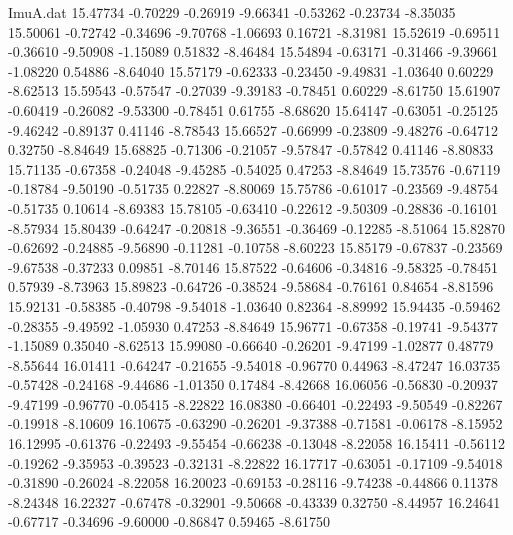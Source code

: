 \begin{filecontents}{ImuA.dat}
  15.47734   -0.70229   -0.26919   -9.66341   -0.53262   -0.23734   -8.35035
  15.50061   -0.72742   -0.34696   -9.70768   -1.06693    0.16721   -8.31981
  15.52619   -0.69511   -0.36610   -9.50908   -1.15089    0.51832   -8.46484
  15.54894   -0.63171   -0.31466   -9.39661   -1.08220    0.54886   -8.64040
  15.57179   -0.62333   -0.23450   -9.49831   -1.03640    0.60229   -8.62513
  15.59543   -0.57547   -0.27039   -9.39183   -0.78451    0.60229   -8.61750
  15.61907   -0.60419   -0.26082   -9.53300   -0.78451    0.61755   -8.68620
  15.64147   -0.63051   -0.25125   -9.46242   -0.89137    0.41146   -8.78543
  15.66527   -0.66999   -0.23809   -9.48276   -0.64712    0.32750   -8.84649
  15.68825   -0.71306   -0.21057   -9.57847   -0.57842    0.41146   -8.80833
  15.71135   -0.67358   -0.24048   -9.45285   -0.54025    0.47253   -8.84649
  15.73576   -0.67119   -0.18784   -9.50190   -0.51735    0.22827   -8.80069
  15.75786   -0.61017   -0.23569   -9.48754   -0.51735    0.10614   -8.69383
  15.78105   -0.63410   -0.22612   -9.50309   -0.28836   -0.16101   -8.57934
  15.80439   -0.64247   -0.20818   -9.36551   -0.36469   -0.12285   -8.51064
  15.82870   -0.62692   -0.24885   -9.56890   -0.11281   -0.10758   -8.60223
  15.85179   -0.67837   -0.23569   -9.67538   -0.37233    0.09851   -8.70146
  15.87522   -0.64606   -0.34816   -9.58325   -0.78451    0.57939   -8.73963
  15.89823   -0.64726   -0.38524   -9.58684   -0.76161    0.84654   -8.81596
  15.92131   -0.58385   -0.40798   -9.54018   -1.03640    0.82364   -8.89992
  15.94435   -0.59462   -0.28355   -9.49592   -1.05930    0.47253   -8.84649
  15.96771   -0.67358   -0.19741   -9.54377   -1.15089    0.35040   -8.62513
  15.99080   -0.66640   -0.26201   -9.47199   -1.02877    0.48779   -8.55644
  16.01411   -0.64247   -0.21655   -9.54018   -0.96770    0.44963   -8.47247
  16.03735   -0.57428   -0.24168   -9.44686   -1.01350    0.17484   -8.42668
  16.06056   -0.56830   -0.20937   -9.47199   -0.96770   -0.05415   -8.22822
  16.08380   -0.66401   -0.22493   -9.50549   -0.82267   -0.19918   -8.10609
  16.10675   -0.63290   -0.26201   -9.37388   -0.71581   -0.06178   -8.15952
  16.12995   -0.61376   -0.22493   -9.55454   -0.66238   -0.13048   -8.22058
  16.15411   -0.56112   -0.19262   -9.35953   -0.39523   -0.32131   -8.22822
  16.17717   -0.63051   -0.17109   -9.54018   -0.31890   -0.26024   -8.22058
  16.20023   -0.69153   -0.28116   -9.74238   -0.44866    0.11378   -8.24348
  16.22327   -0.67478   -0.32901   -9.50668   -0.43339    0.32750   -8.44957
  16.24641   -0.67717   -0.34696   -9.60000   -0.86847    0.59465   -8.61750

\end{filecontents}
